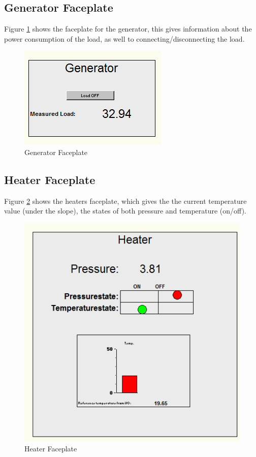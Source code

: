 \subsection{Generator Faceplate}

Figure \ref{Generator_fp} shows the faceplate for the generator, this gives information about the power consumption of the load, as well to connecting/disconnecting the load.

\begin{figure}[!htb]
    \centerline{\includegraphics[scale=1]{images/Generator}}
    \caption{Generator Faceplate}
    \label{Generator_fp}

\end{figure}

\hfill \break

\subsection{Heater Faceplate}

Figure \ref{HeaterFaceplate} shows the heaters faceplate, which gives the the current temperature value (under the slope), the states of both pressure and temperature (on/off).

\begin{figure}[!htb]
    \centerline{\includegraphics[scale=0.7]{images/Pressure_state_off}}
    \caption{Heater Faceplate}
    \label{HeaterFaceplate}

\end{figure}


